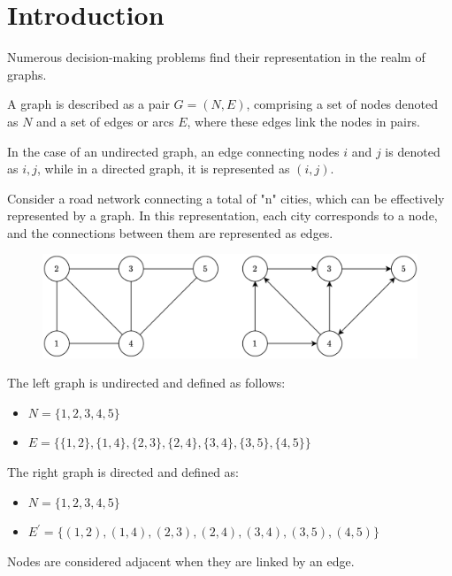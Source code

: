 \section{Introduction}

Numerous decision-making problems find their representation in the realm of graphs.
\begin{definition}
    A graph is described as a pair $G=(N,E)$, comprising a set of nodes denoted as $N$ and a set of edges or arcs $E$, where these edges link the nodes in pairs.
\end{definition}   
\begin{definition}
    In the case of an undirected graph, an edge connecting nodes $i$ and $j$ is denoted as ${i,j}$, while in a directed graph, it is represented as $(i,j)$.    
\end{definition}
\begin{example}
    Consider a road network connecting a total of "n" cities, which can be effectively represented by a graph. 
    In this representation, each city corresponds to a node, and the connections between them are represented as edges.        
    \begin{figure}[H]
        \centering
        \includegraphics[width=0.6\linewidth]{images/graph.png}
    \end{figure}
    The left graph is undirected and defined as follows:
    \begin{itemize}
        \item $N=\{1,2,3,4,5\}$
        \item $E=\{\{1,2\},\{1,4\},\{2,3\},\{2,4\},\{3,4\},\{3,5\},\{4,5\}\}$
    \end{itemize}
    The right graph is directed and defined as:
    \begin{itemize}
        \item $N=\{1,2,3,4,5\}$
        \item $E^{'}=\{(1,2),(1,4),(2,3),(2,4),(3,4),(3,5),(4,5)\}$
    \end{itemize}
\end{example}
\newpage
\begin{definition}
    Nodes are considered adjacent when they are linked by an edge.
\end{definition}
